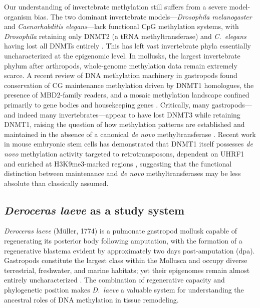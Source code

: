 \documentclass[12pt]{article}
\begin{document}
Our understanding of invertebrate methylation still suffers from a severe model-organism bias. The two dominant invertebrate models---\textit{Drosophila melanogaster} and \textit{Caenorhabditis elegans}---lack functional CpG methylation systems, with \textit{Drosophila} retaining only DNMT2 (a tRNA methyltransferase) and \textit{C.\ elegans} having lost all DNMTs entirely \cite{pongerEvolutionaryDiversificationDNA2005, lykoDNAMethyltransferaseFamily2018}. This has left vast invertebrate phyla essentially uncharacterized at the epigenomic level. In mollusks, the largest invertebrate phylum after arthropods, whole-genome methylation data remain extremely scarce. A recent review of DNA methylation machinery in gastropods found conservation of CG maintenance methylation driven by DNMT1 homologues, the presence of MBD2-family readers, and a mosaic methylation landscape confined primarily to gene bodies and housekeeping genes \cite{haidarDNAMethylationMachinery2024}. Critically, many gastropods---and indeed many invertebrates---appear to have lost DNMT3 while retaining DNMT1, raising the question of how methylation patterns are established and maintained in the absence of a canonical \textit{de novo} methyltransferase \cite{haidarDNAMethylationMachinery2024, pongerEvolutionaryDiversificationDNA2005}. Recent work in mouse embryonic stem cells has demonstrated that DNMT1 itself possesses \textit{de novo} methylation activity targeted to retrotransposons, dependent on UHRF1 and enriched at H3K9me3-marked regions \cite{haggertyDnmt1HasNovo2021}, suggesting that the functional distinction between maintenance and \textit{de novo} methyltransferases may be less absolute than classically assumed.


\subsection*{\textit{Deroceras laeve} as a study system}

\textit{Deroceras laeve} (M\"{u}ller, 1774) is a pulmonate gastropod mollusk capable of regenerating its posterior body following amputation, with the formation of a regenerative blastema evident by approximately two days post-amputation (dpa). Gastropods constitute the largest class within the Mollusca and occupy diverse terrestrial, freshwater, and marine habitats; yet their epigenomes remain almost entirely uncharacterized \cite{haidarDNAMethylationMachinery2024}. The combination of regenerative capacity and phylogenetic position makes \textit{D.\ laeve} a valuable system for understanding the ancestral roles of DNA methylation in tissue remodeling.
\end{document}
